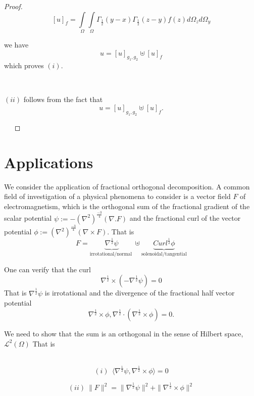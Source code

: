 \documentclass{amsart}%
\theoremstyle{plain}
\numberwithin{equation}{section}
\begin{document}
\begin{proof}
\[
\left[  u\right]  _{f}=%
{\displaystyle\int\limits_{\Omega}}
{\displaystyle\int\limits_{\Omega}}
\Gamma_{\frac{1}{2}}\left(  y-x\right)  \Gamma_{\frac{1}{2}}\left(
z-y\right)  f(z)d\Omega_{z}d\Omega_{y}%
\]


we have
\[
u=\left[  u\right]  _{g_{1},g_{2}}\uplus\left[  u\right]  _{f}%
\]
which proves $\left(  i\right)  $.

\ 

$\left(  ii\right)  $ follows from the fact that
\[
u=\left[  u\right]  _{g_{1},g_{2}}\uplus\left[  u\right]  _{f}\text{.}%
\]


\ \ 
\end{proof}

\section{\textbf{Applications}}

We consider the application of fractional orthogonal decomposition. A common
field of investigation of a physical phenomena to consider is a vector field
$F$ of electromagnetism, which is the orthogonal sum of the fractional
gradient of the scalar potential $\psi:=-\left(  \nabla^{2}\right)
^{\frac{-3}{4}}\left(  \nabla.F\right)  $ and the fractional curl of the
vector potential $\phi:=\left(  \nabla^{2}\right)  ^{\frac{-3}{4}}\left(
\nabla\times F\right)  $. That is%
\[
F=\underset{\text{irrotational/normal }}{\underbrace{\nabla^{\frac{1}{2}}\psi
}}\uplus\underset{\text{solenoidal/tangential}}{\underbrace{Curl^{\frac{1}{2}%
}\phi}}%
\]


One can verify that the curl
\[
\nabla^{\frac{1}{2}}\times\left(  -\nabla^{\frac{1}{2}}\psi\right)  =0
\]
That is $\nabla^{\frac{1}{2}}\psi$ is irrotational and the divergence of the
fractional half vector potential
\[
\nabla^{\frac{1}{2}}\times\phi,\nabla^{\frac{1}{2}}\cdot\left(  \nabla
^{\frac{1}{2}}\times\phi\right)  =0.
\]


We need to show that the sum is an orthogonal in the sense of Hilbert space, $%
\mathcal{L}%
^{2}\left(  \Omega\right)  $ That is

$\qquad$%
\[
(i)\ \ \langle\nabla^{\frac{1}{2}}\psi,\nabla^{\frac{1}{2}}\times\phi\rangle=0
\]


\qquad%
\[
(ii)\ \parallel F\parallel^{2}=\parallel\nabla^{\frac{1}{2}}\psi\parallel
^{2}+\parallel\nabla^{\frac{1}{2}}\times\phi\parallel^{2}%
\]
\end{document}
